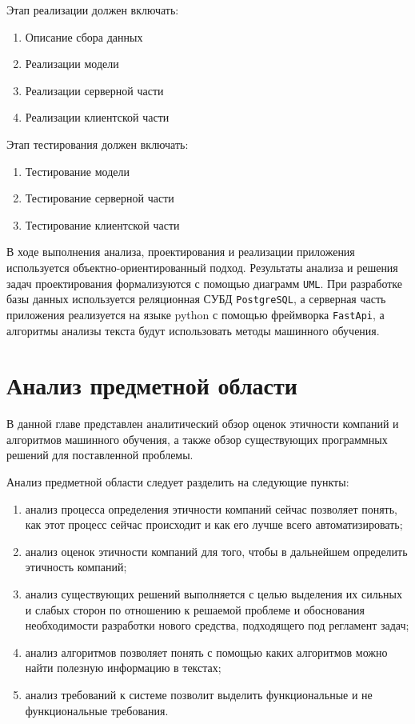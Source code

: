 \documentclass[PI, VKR]{HSEUniversity}
\begin{document}
Этап реализации должен включать:
\begin{enumerate}
\item Описание сбора данных
\item Реализации модели
\item Реализации серверной части
\item Реализации клиентской части
\end{enumerate}

Этап тестирования должен включать:
\begin{enumerate}
\item Тестирование модели
\item Тестирование серверной части
\item Тестирование клиентской части
\end{enumerate}

В ходе выполнения анализа, проектирования и реализации приложения используется объектно-ориентированный подход. Результаты анализа и решения задач проектирования формализуются с помощью диаграмм \texttt{UML}. При разработке базы данных используется реляционная СУБД \texttt{PostgreSQL}, а серверная часть приложения реализуется на языке python \autocite{10.5555/1593511} с помощью фреймворка \texttt{FastApi}, а алгоритмы анализы текста будут использовать методы машинного обучения.
\chapter{Анализ предметной области}
\label{sec:org2f23453}
В данной главе представлен аналитический обзор оценок этичности компаний и алгоритмов машинного обучения, а также обзор существующих программных решений для поставленной проблемы.

Анализ предметной области следует разделить на следующие пункты:
\begin{enumerate}
\item анализ процесса определения этичности компаний сейчас позволяет понять, как этот процесс сейчас происходит и как его лучше всего автоматизировать;
\item анализ оценок этичности компаний для того, чтобы в дальнейшем определить этичность компаний;
\item анализ существующих решений выполняется с целью выделения их сильных и слабых сторон по отношению к решаемой проблеме и обоснования необходимости разработки нового средства, подходящего под регламент задач;
\item анализ алгоритмов позволяет понять с помощью каких алгоритмов можно найти полезную информацию в текстах;
\item анализ требований к системе позволит выделить функциональные и не функциональные требования.
\end{enumerate}
\end{document}
